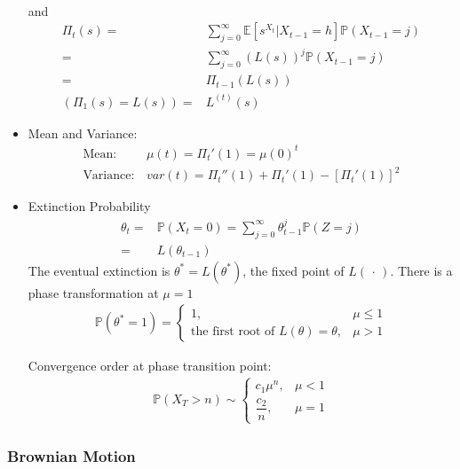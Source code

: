 \begin{itemize}[topsep=2pt,itemsep=0pt]
\begin{align}
    \end{align}
    and 
    \begin{align}
        \Pi_t(s)=&\sum_{j=0}^\infty \mathbb{E}\left[ s^{X_t}|X_{t-1}=h \right] \mathbb{P}\left( X_{t-1}=j \right) \\
        =&\sum_{j=0}^\infty \left(L(s)\right)^{j}\mathbb{P}\left( X_{t-1}=j \right) \\
        =&\Pi_{t-1}\left(L(s)\right)\\
        (\Pi_1(s)=L(s))=&L^{(t)}(s) 
    \end{align}
    \item Mean and Variance:
    \begin{align}
        \text{Mean}:&\, \mu (t) = \Pi_t'(1)=\mu(0) ^t\\
        \text{Variance}:&\,var(t)=\Pi_t''(1)+\Pi_t'(1)-[\Pi_t'(1)]^2
    \end{align}
    \item Extinction Probability
    \begin{align}
        \theta _t=&\mathbb{P}\left( X_t=0 \right)= \sum_{j=0}^\infty \theta ^j_{t-1}\mathbb{P}\left( Z=j \right) \\=
        &L(\theta _{t-1})
    \end{align}
    The eventual extinction is $ \theta ^*=L(\theta ^*) $, the fixed point of $ L(\, \cdot \, ) $.
    There is a phase transformation at $ \mu = 1 $
    \begin{align}
        \mathbb{P}\left( \theta ^*=1 \right) =\begin{cases}
            1,&\mu \leq 1\\
            \text{the first root of }L(\theta )=\theta ,& \mu >1
        \end{cases} 
    \end{align}
    
    Convergence order at phase transition point:
    \begin{align}
        \mathbb{P}\left( X_T>n \right) \sim \begin{cases}
            c_1\mu ^n,&\mu <1\\
            \dfrac{c_2}{n},&\mu =1
        \end{cases}  
    \end{align}
     
\end{itemize}


\subsubsection{Brownian Motion}
\hypertarget{BrownianProcess}{}

